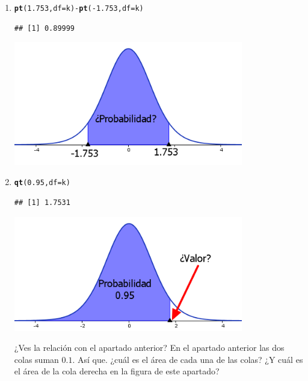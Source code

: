 \documentclass[10pt,a4paper]{article}\usepackage[]{graphicx}\usepackage[]{color}
\makeatletter
\newcommand{\hlnum}[1]{\textcolor[rgb]{0.686,0.059,0.569}{#1}}%
\newcommand{\hlopt}[1]{\textcolor[rgb]{0,0,0}{#1}}%
\newcommand{\hlstd}[1]{\textcolor[rgb]{0.345,0.345,0.345}{#1}}%
\newcommand{\hlkwc}[1]{\textcolor[rgb]{0.333,0.667,0.333}{#1}}%
\newcommand{\hlkwd}[1]{\textcolor[rgb]{0.737,0.353,0.396}{\textbf{#1}}}%
\newenvironment{kframe}{%
 \def\at@end@of@kframe{}%
 \ifinner\ifhmode%
  \def\at@end@of@kframe{\end{minipage}}%
  \begin{minipage}{\columnwidth}%
 \fi\fi%
 \def\FrameCommand##1{\hskip\@totalleftmargin \hskip-\fboxsep
 \colorbox{shadecolor}{##1}\hskip-\fboxsep
     \hskip-\linewidth \hskip-\@totalleftmargin \hskip\columnwidth}%
 \MakeFramed {\advance\hsize-\width
   \@totalleftmargin\z@ \linewidth\hsize
   \@setminipage}}%
 {\par\unskip\endMakeFramed%
 \at@end@of@kframe}
\newenvironment{knitrout}{}{} %
\makeatother
\begin{document}
\begin{enumerate}
  \item
\begin{knitrout}
\color{fgcolor}\begin{kframe}
\begin{alltt}
\hlkwd{pt}\hlstd{(}\hlnum{1.753}\hlstd{,} \hlkwc{df}\hlstd{=k)} \hlopt{-} \hlkwd{pt}\hlstd{(}\hlopt{-}\hlnum{1.753}\hlstd{,} \hlkwc{df}\hlstd{=k)}
\end{alltt}
\begin{verbatim}
## [1] 0.89999
\end{verbatim}
\end{kframe}
\end{knitrout}
  \begin{center}
        \includegraphics[width=10cm]{../fig/Tut06-22.png}
  \end{center}

  \item
\begin{knitrout}
\color{fgcolor}\begin{kframe}
\begin{alltt}
\hlkwd{qt}\hlstd{(}\hlnum{0.95}\hlstd{,} \hlkwc{df}\hlstd{=k)}
\end{alltt}
\begin{verbatim}
## [1] 1.7531
\end{verbatim}
\end{kframe}
\end{knitrout}
  \begin{center}
        \includegraphics[width=10cm]{../fig/Tut06-23.png}
  \end{center}
  ¿Ves la relación con el apartado anterior? En el apartado anterior las dos colas suman $0.1$. Así que. ¿cuál es el área de cada una de las colas? ¿Y cuál es el área de la cola derecha en la figura de este apartado?


\end{enumerate}
\end{document}

